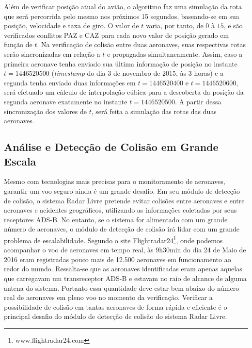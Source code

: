 Além de verificar posição atual do avião, o algoritmo faz uma simulação da rota que será percorrida pelo mesmo nos próximos 15 segundos, baseando-se em sua posição, velocidade e taxa de giro. O valor de \(t\) varia, por tanto, de \(0\) à \(15\), e são verificados conflitos PAZ e CAZ para cada novo valor de posição gerado em função de \(t\). Na verificação de colisão entre duas aeronaves, suas respectivas rotas serão sincronizadas em relação a \(t\) e propagadas simultaneamente. Assim, caso a primeira aeronave tenha enviado sua última informação de posição no instante \(t = 1446520500\) (\textit{timestamp} do dia 3 de novembro de 2015, às 3 horas) e a segunda tenha enviado duas informações em \(t = 1446520400\) e \(t = 1446520600\), será efetuado um cálculo de interpolação cúbica para a descoberta da posição da segunda aeronave exatamente no instante \(t = 1446520500\). A partir dessa sincronização dos valores de \(t\), será feita a simulação das rotas das duas aeronaves.

\subsection{Análise e Detecção de Colisão em Grande Escala}

Mesmo com tecnologias mais precisas para o monitoramento de aeronaves, garantir um voo seguro ainda é um grande desafio. Em seu módulo de detecção de colisão, o sistema Radar Livre pretende evitar colisões entre aeronaves e entre aeronaves e acidentes geográficos, utilizando as informações coletadas por seus receptores ADS-B. No entanto, se o sistema for alimentado com um grande número de aeronaves, o módulo de detecção de colisão irá lidar com um grande problema de escalabilidade. Segundo o site Flightradar24\footnote{www.flightradar24.com}, onde podemos acompanhar o voo de aeronaves em tempo real, às 9h30min do dia 24 de Maio de 2016 eram registradas pouco mais de 12.500 aeronaves em funcionamento ao redor do mundo. Ressalta-se que as aeronaves identificadas eram apenas aquelas que carregavam um transreceptor ADS-B e estavam no raio de alcance de alguma antena do sistema. Portanto essa quantidade deve estar bem abaixo do número real de aeronaves em pleno voo no momento da verificação. Verificar a possibilidade de colisão em tantas aeronaves de forma rápida e eficiente é o principal desafio do módulo de detecção de colisão do sistema Radar Livre.

